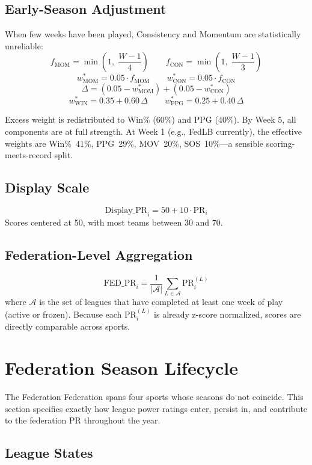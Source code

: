 \documentclass[11pt,a4paper]{article}
\begin{document}
\subsection{Early-Season Adjustment}\label{sec:earlyadj}

When few weeks have been played, Consistency and Momentum are statistically unreliable:
\[
f_{\text{MOM}} = \min\!\left(1,\; \frac{W-1}{4}\right) \qquad f_{\text{CON}} = \min\!\left(1,\; \frac{W-1}{3}\right)
\]
\[
w^*_{\text{MOM}} = 0.05 \cdot f_{\text{MOM}} \qquad w^*_{\text{CON}} = 0.05 \cdot f_{\text{CON}}
\]
\[
\Delta = (0.05 - w^*_{\text{MOM}}) + (0.05 - w^*_{\text{CON}})
\]
\[
w^*_{\text{WIN}} = 0.35 + 0.60\,\Delta \qquad w^*_{\text{PPG}} = 0.25 + 0.40\,\Delta
\]

Excess weight is redistributed to Win\% (60\%) and PPG (40\%). By Week 5, all components are at full strength. At Week 1 (e.g., FedLB currently), the effective weights are Win\%~41\%, PPG~29\%, MOV~20\%, SOS~10\%---a sensible scoring-meets-record split.

\subsection{Display Scale}
\[
\text{Display\_PR}_i = 50 + 10 \cdot \text{PR}_i
\]
Scores centered at 50, with most teams between 30 and 70.

\subsection{Federation-Level Aggregation}
\[
\text{FED\_PR}_i = \frac{1}{|\mathcal{A}|} \sum_{L \in \mathcal{A}} \text{PR}^{(L)}_i
\]
where $\mathcal{A}$ is the set of leagues that have completed at least one week of play (active or frozen). Because each $\text{PR}^{(L)}_i$ is already z-score normalized, scores are directly comparable across sports.


\section{Federation Season Lifecycle}

The Federation Federation spans four sports whose seasons do not coincide. This section specifies exactly how league power ratings enter, persist in, and contribute to the federation PR throughout the year.

\subsection{League States}
\end{document}
